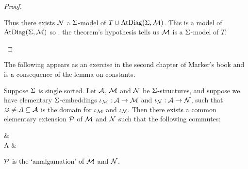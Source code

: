 \begin{proof}
\begin{backward}
        Thus there exists $\NN$ a $\Si$-model of 
        $T \cup \atdiag{\Si}{\MM}$.
        This is a model of $\atdiag{\Si}{\MM}$ so
        .
        the theorem's hypothesis tells us $\MM$ is a $\Si$-model of $T$.
    \end{backward}
\end{proof}

The following appears as an exercise in the second 
chapter of Marker's book \cite{marker} and is a consequence of the lemma on 
constants.
\begin{cor}[Amalgamation]
    Suppose $\Si$ is single sorted.
    Let $\AA$, $\MM$ and $\NN$ be $\Si$-structures,
    and suppose we have  
    elementary $\Si$-embeddings
    $\io_\MM : \AA \to \MM$ and 
    $\io_\NN : \AA \to \NN$, such that $\nothing \ne A \subs \AA$
    is the domain for $\io_\MM$ and $\io_\NN$.
    Then there exists a common elementary extension $\PP$ of $\MM$ and $\NN$
    such that the following commutes:
    \begin{cd}
        \MM \ar[r] &\PP \\
        A \ar[u, "\io_\MM"] \ar[r, "\io_\NN", swap] &\NN \ar[u]
    \end{cd}
    $\PP$ is the `amalgamation' of $\MM$ and $\NN$.
\end{cor}
